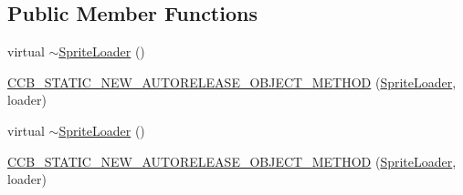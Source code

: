 \subsection*{Public Member Functions}
\begin{DoxyCompactItemize}
\item 
virtual \hyperlink{classcocosbuilder_1_1SpriteLoader_ab033b5aea9728e5d7903cb48f9fa652d}{$\sim$\+Sprite\+Loader} ()
\item 
\hyperlink{classcocosbuilder_1_1SpriteLoader_a32c1c1b2db495bec16de4d1d3849a958}{C\+C\+B\+\_\+\+S\+T\+A\+T\+I\+C\+\_\+\+N\+E\+W\+\_\+\+A\+U\+T\+O\+R\+E\+L\+E\+A\+S\+E\+\_\+\+O\+B\+J\+E\+C\+T\+\_\+\+M\+E\+T\+H\+OD} (\hyperlink{classcocosbuilder_1_1SpriteLoader}{Sprite\+Loader}, loader)
\item 
virtual \hyperlink{classcocosbuilder_1_1SpriteLoader_ab033b5aea9728e5d7903cb48f9fa652d}{$\sim$\+Sprite\+Loader} ()
\item 
\hyperlink{classcocosbuilder_1_1SpriteLoader_a32c1c1b2db495bec16de4d1d3849a958}{C\+C\+B\+\_\+\+S\+T\+A\+T\+I\+C\+\_\+\+N\+E\+W\+\_\+\+A\+U\+T\+O\+R\+E\+L\+E\+A\+S\+E\+\_\+\+O\+B\+J\+E\+C\+T\+\_\+\+M\+E\+T\+H\+OD} (\hyperlink{classcocosbuilder_1_1SpriteLoader}{Sprite\+Loader}, loader)
\end{DoxyCompactItemize}
